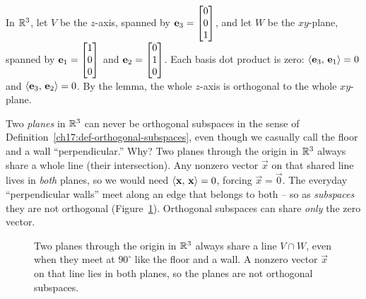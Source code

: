 \begin{example}\label{ch17:line-perp-plane}
In $\mathbb{R}^3$, let $V$ be the $z$-axis, spanned by $\mathbf{e}_3=\begin{bmatrix}0\\0\\1\end{bmatrix}$, and let $W$ be the
$xy$-plane, spanned by $\mathbf{e}_1=\begin{bmatrix}1\\0\\0\end{bmatrix}$ and $\mathbf{e}_2=\begin{bmatrix}0\\1\\0\end{bmatrix}$. Each basis
dot product is zero: $\langle \mathbf{e}_3,\, \mathbf{e}_1 \rangle=0$ and $\langle \mathbf{e}_3,\, \mathbf{e}_2 \rangle=0$. By the
lemma, the whole $z$-axis is orthogonal to the whole $xy$-plane.
\end{example}

\begin{trapbox}
Two \emph{planes} in $\mathbb{R}^3$ can never be orthogonal subspaces in the sense of
Definition~\ref{ch17:def-orthogonal-subspaces}, even though we casually call the floor and a wall
``perpendicular.'' Why? Two planes through the origin in $\mathbb{R}^3$ always share a whole line (their
intersection). Any nonzero vector $\vec{x}$ on that shared line lives in \emph{both} planes, so we
would need $\langle \mathbf{x},\, \mathbf{x} \rangle=0$, forcing $\vec{x}=\vec{0}$. The everyday ``perpendicular
walls'' meet along an edge that belongs to both -- so as \emph{subspaces} they are not orthogonal
(Figure~\ref{ch17:planes-trap}). Orthogonal subspaces can share \emph{only} the zero vector.
\end{trapbox}

\begin{figure}[H]
\centering
{}
\caption{Two planes through the origin in $\mathbb{R}^3$ always share a line $V\cap W$, even when they
meet at $90^\circ$ like the floor and a wall. A nonzero vector $\vec{x}$ on that line lies in both
planes, so the planes are not orthogonal subspaces.}
\label{ch17:planes-trap}
\end{figure}

